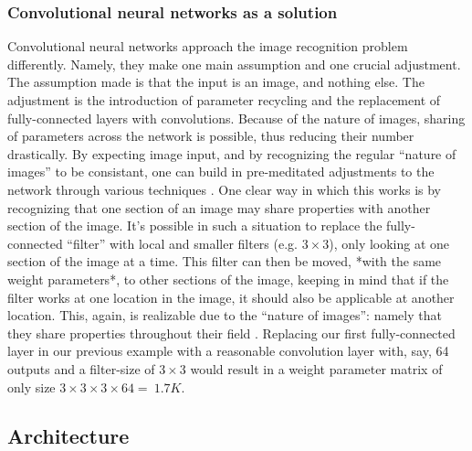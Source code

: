 \subsubsection{Convolutional neural networks as a solution}
Convolutional neural networks approach the image recognition problem differently. Namely, they make one main assumption and one crucial adjustment. The assumption made is that the input is an image, and nothing else. The adjustment is the introduction of parameter recycling and the replacement of fully-connected layers with convolutions. Because of the nature of images, sharing of parameters across the network is possible, thus reducing their number drastically. By expecting image input, and by recognizing the regular ``nature of images'' to be consistant, one can build in pre-meditated adjustments to the network through various techniques \cite{convnets}. One clear way in which this works is by recognizing that one section of an image may share properties with another section of the image. It's possible in such a situation to replace the fully-connected ``filter'' with local and smaller filters (e.g. $3\times3$), only looking at one section of the image at a time. This filter can then be moved, *with the same weight parameters*, to other sections of the image, keeping in mind that if the filter works at one location in the image, it should also be applicable at another location. This, again, is realizable due to the ``nature of images'': namely that they share properties throughout their field \cite{convnets}. Replacing our first fully-connected layer in our previous example with a reasonable convolution layer with, say, 64 outputs and a filter-size of $3\times3$ would result in a weight parameter matrix of only size $3\times3\times3\times64 = ~1.7K$.


\subsection{Architecture}
